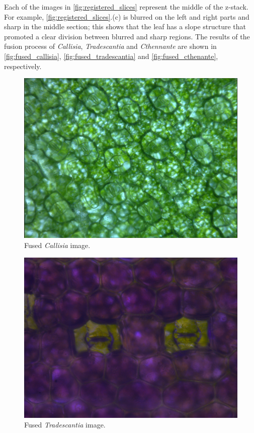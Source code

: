 Each of the images in \autoref{fig:registered_slices} represent the middle of the z-stack. For example, \autoref{fig:registered_slices}.(c) is blurred on the left and right parts and sharp in the middle section; this shows that the leaf has a slope structure that promoted a clear division between blurred and sharp regions. The results of the fusion process of \textit{Callisia}, \textit{Tradescantia} and \textit{Cthennante} are shown in \autoref{fig:fused_callisia}, \autoref{fig:fused_tradescantia} and \autoref{fig:fused_cthenante}, respectively.

\begin{figure}[H]
  \centering
  \caption{Fused \textit{Callisia} image.}
  \label{fig:fused_callisia}
  \includegraphics[scale=0.3]{images/fused_callisia.png}
  \centering
  \fautor
\end{figure}

\begin{figure}[H]
    \centering
    \caption{Fused \textit{Tradescantia} image.}
    \label{fig:fused_tradescantia}
    \includegraphics[scale=0.3]{images/fused_tradescantia.png}
    \centering
    \fautor
\end{figure}

